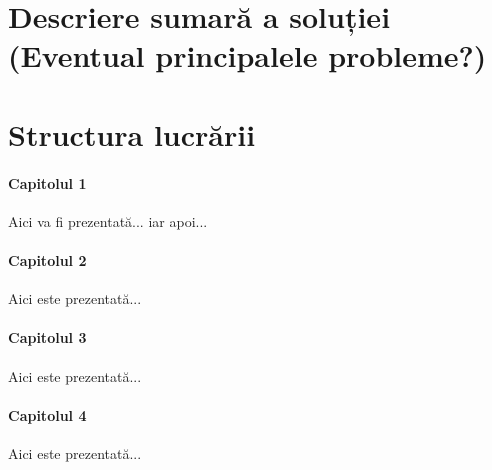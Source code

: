 \section*{Descriere sumară a soluției (Eventual principalele probleme?)}

\section*{Structura lucrării}
\paragraph{Capitolul 1}
Aici va fi prezentată... iar apoi...

\paragraph{Capitolul 2}
Aici este prezentată...

\paragraph{Capitolul 3}
Aici este prezentată...

\paragraph{Capitolul 4}
Aici este prezentată...
